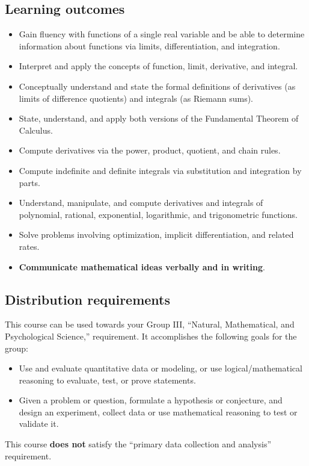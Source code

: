 \documentclass[11pt,twoside]{amsart}
\begin{document}
\subsection*{Learning outcomes}
\begin{itemize}
\item Gain fluency with functions of a single real variable and be able to determine information about functions via limits, differentiation, and integration.
\item Interpret and apply the concepts of function, limit, derivative, and integral.
\item Conceptually understand and state the formal definitions of derivatives (as limits of difference quotients) and integrals (as Riemann sums).
\item State, understand, and apply both versions of the Fundamental Theorem of Calculus.
\item Compute derivatives via the power, product, quotient, and chain rules.
\item Compute indefinite and definite integrals via substitution and integration by parts.
\item Understand, manipulate, and compute derivatives and integrals of polynomial, rational, exponential, logarithmic, and trigonometric functions.
\item Solve problems involving optimization, implicit differentiation, and related rates.
\item \textbf{Communicate mathematical ideas verbally and in writing}.
\end{itemize}

\subsection*{Distribution requirements}
This course can be used towards your Group III, ``Natural, Mathematical, and Psychological Science,'' requirement.  It accomplishes the following goals for the group:
\begin{itemize}
\item Use and evaluate quantitative data or modeling, or use logical/mathematical reasoning to evaluate, test, or prove statements.
\item Given a problem or question, formulate a hypothesis or conjecture, and design an experiment, collect data or use mathematical reasoning to test or validate it.
\end{itemize}
This course \textbf{does not} satisfy the ``primary data collection and analysis'' requirement.
\end{document}
